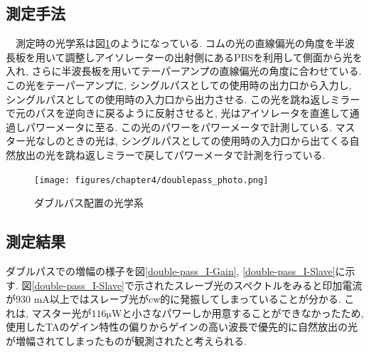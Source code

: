 \documentclass[uplatex, dvipdfmx, a4paper, report, papersize, 11pt]{jsbook}
\begin{document}
\subsection{測定手法}
　測定時の光学系は図\ref{doublepass_photo}のようになっている. コムの光の直線偏光の角度を半波長板を用いて調整しアイソレーターの出射側にあるPBSを利用して側面から光を入れ, さらに半波長板を用いてテーパーアンプの直線偏光の角度に合わせている. この光をテーパーアンプに, シングルパスとしての使用時の出力口から入力し, シングルパスとしての使用時の入力口から出力させる. この光を跳ね返しミラーで元のパスを逆向きに戻るように反射させると, 光はアイソレータを直進して通過しパワーメータに至る. この光のパワーをパワーメータで計測している. マスター光なしのときの光は, シングルパスとしての使用時の入力口から出てくる自然放出の光を跳ね返しミラーで戻してパワーメータで計測を行っている.
\begin{figure}[H]
 \begin{center}
  \texttt{[image: figures/chapter4/doublepass\_photo.png]}
\end{center}
 \caption{ダブルパス配置の光学系}
 \label{doublepass_photo}
\end{figure}

\subsection{測定結果}
ダブルパスでの増幅の様子を図\ref{double-pass_I-Gain}, \ref{double-pass_I-Slave}に示す. 図\ref{double-pass_I-Slave}で示されたスレーブ光のスペクトルをみると印加電流が$930$ mA以上ではスレーブ光がcw的に発振してしまっていることが分かる. これは, マスター光が$116 \mathrm{\mu W}$と小さなパワーしか用意することができなかったため, 使用したTAのゲイン特性の偏りからゲインの高い波長で優先的に自然放出の光が増幅されてしまったものが観測されたと考えられる.
\end{document}
